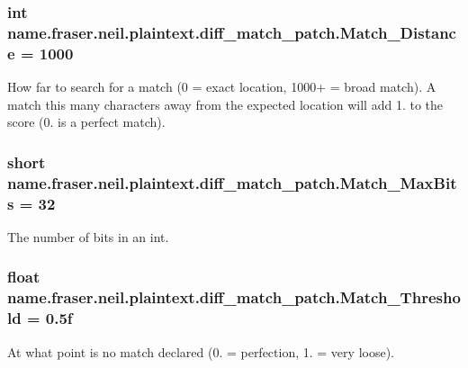\subsubsection[{\texorpdfstring{Match\+\_\+\+Distance}{Match_Distance}}]{\setlength{\rightskip}{0pt plus 5cm}int name.\+fraser.\+neil.\+plaintext.\+diff\+\_\+match\+\_\+patch.\+Match\+\_\+\+Distance = 1000}\hypertarget{classname_1_1fraser_1_1neil_1_1plaintext_1_1diff__match__patch_a76beef22e81c595d8c6cd92c7daaa115}{}\label{classname_1_1fraser_1_1neil_1_1plaintext_1_1diff__match__patch_a76beef22e81c595d8c6cd92c7daaa115}
How far to search for a match (0 = exact location, 1000+ = broad match). A match this many characters away from the expected location will add 1. to the score (0. is a perfect match). 
\subsubsection[{\texorpdfstring{Match\+\_\+\+Max\+Bits}{Match_MaxBits}}]{\setlength{\rightskip}{0pt plus 5cm}short name.\+fraser.\+neil.\+plaintext.\+diff\+\_\+match\+\_\+patch.\+Match\+\_\+\+Max\+Bits = 32\hspace{0.3cm}{\ttfamily [private]}}\hypertarget{classname_1_1fraser_1_1neil_1_1plaintext_1_1diff__match__patch_a0ace68631fde71f6abcefc522b9472e7}{}\label{classname_1_1fraser_1_1neil_1_1plaintext_1_1diff__match__patch_a0ace68631fde71f6abcefc522b9472e7}
The number of bits in an int. 
\subsubsection[{\texorpdfstring{Match\+\_\+\+Threshold}{Match_Threshold}}]{\setlength{\rightskip}{0pt plus 5cm}float name.\+fraser.\+neil.\+plaintext.\+diff\+\_\+match\+\_\+patch.\+Match\+\_\+\+Threshold = 0.\+5f}\hypertarget{classname_1_1fraser_1_1neil_1_1plaintext_1_1diff__match__patch_a5b4efe86c66f396067212d1bb876ef3a}{}\label{classname_1_1fraser_1_1neil_1_1plaintext_1_1diff__match__patch_a5b4efe86c66f396067212d1bb876ef3a}
At what point is no match declared (0. = perfection, 1. = very loose). 
